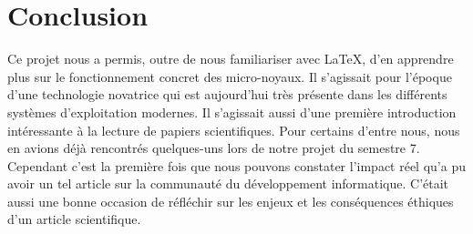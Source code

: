 \documentclass[a4paper, 12pt]{article}
\begin{document}
\clearpage 
\section*{Conclusion}

Ce projet nous a permis, outre de nous familiariser avec \LaTeX{}, d'en apprendre plus sur le fonctionnement concret des micro-noyaux. Il s'agissait pour l'époque d'une technologie novatrice qui est aujourd'hui très présente dans les différents systèmes d'exploitation modernes. Il s'agissait aussi d'une première introduction intéressante à la lecture de papiers scientifiques. Pour certains d'entre nous, nous en avions déjà rencontrés quelques-uns lors de notre projet du semestre 7. Cependant c'est la première fois que nous pouvons constater l'impact réel qu'a pu avoir un tel article sur la communauté du développement informatique. C'était aussi une bonne occasion de réfléchir sur les enjeux et les conséquences éthiques d'un article scientifique.

% 
% 


\end{document}

